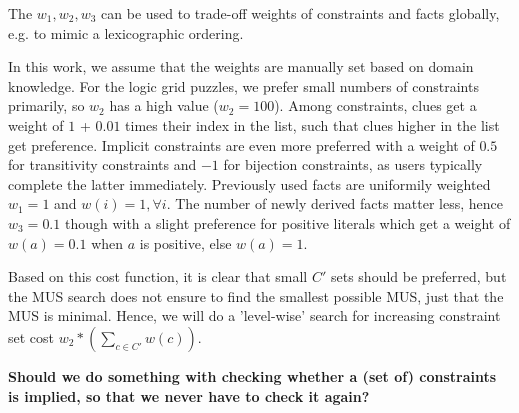 The $w_1, w_2, w_3$ can be used to trade-off weights of constraints and facts globally, e.g. to mimic a lexicographic ordering.

In this work, we assume that the weights are manually set based on domain knowledge. For the logic grid puzzles, we prefer small numbers of constraints primarily, so $w_2$ has a high value ($w_2=100$). Among constraints, clues get a weight of $1$ + $0.01$ times their index in the list, such that clues higher in the list get preference. Implicit constraints are even more preferred with a weight of $0.5$ for transitivity constraints and $-1$ for bijection constraints, as users typically complete the latter immediately.
Previously used facts are uniformily weighted $w_1=1$ and $w(i)=1, \forall i$. The number of newly derived facts matter less, hence $w_3=0.1$ though with a slight preference for positive literals which get a weight of $w(a)=0.1$ when $a$ is positive, else $w(a)=1$.

Based on this cost function, it is clear that small $C'$ sets should be preferred, but the MUS search does not ensure to find the smallest possible MUS, just that the MUS is minimal. Hence, we will do a 'level-wise' search for increasing constraint set cost $w_2*(\sum_{c \in C'} w(c))$.

\textbf{Should we do something with checking whether a (set of) constraints is implied, so that we never have to check it again?}


%
%
%	
%
%
%
%


